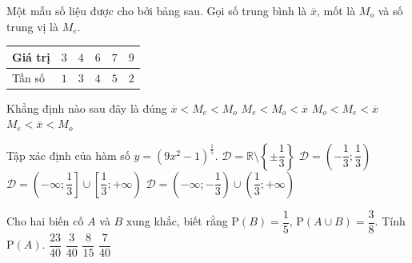 \begin{ex}
	Một mẫu số liệu được cho bởi bảng sau. Gọi số trung bình là $\overline{x}$, mốt là $M_o$ và số trung vị là $M_e$.
	\begin{center}
		\begin{tabular}{|l|c|c|c|c|c|}
			\hline
			Giá trị & $3$ & $4$ & $6$ & $7$ & $9$ \\
			\hline
			Tần số & $1$ & $3$ & $4$ & $5$ & $2$ \\
			\hline
		\end{tabular}
	\end{center}
	Khẳng định nào sau đây là đúng
	\choice
	{$\overline{x}<M_e<M_o$}
	{$M_e<M_o<\overline{x}$}
	{$M_o<M_e<\overline{x}$}
	{\True$M_e<\overline{x}<M_o$}
\end{ex}

\begin{ex}
	Tập xác định của hàm số $y=\left(9x^2-1\right)^{\frac{1}{5}}$.
	\choice
	{$\mathscr{D}=\mathbb{R}\setminus\left\{\pm\dfrac{1}{3}\right\}$}
	{$\mathscr{D}=\left(-\dfrac{1}{3};\dfrac{1}{3}\right)$}
	{$\mathscr{D}=\left(-\infty;\dfrac{1}{3}\right]\cup \left[\dfrac{1}{3};+\infty\right)$}
	{\True $\mathscr{D}=\left(-\infty;-\dfrac{1}{3}\right)\cup \left(\dfrac{1}{3};+\infty\right)$}
\end{ex}

\begin{ex}
	Cho hai biến cố $A$ và $B$ xung khắc, biết rằng $\mathrm{P}(B)=\dfrac{1}{5}$, $\mathrm{P}(A\cup B)=\dfrac{3}{8}$. Tính $\mathrm{P}(A)$.
	\choice
	{$\dfrac{23}{40}$}
	{$\dfrac{3}{40}$}
	{$\dfrac{8}{15}$}
	{\True $\dfrac{7}{40}$}
\end{ex}

